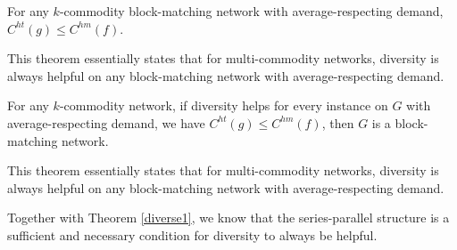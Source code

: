 \begin{theorem}
For any $k$-commodity block-matching network with average-respecting demand, $C^{ht}(g)\le C^{hm}(f)$.
\end{theorem}

\begin{proof-sketch}

This theorem essentially states that for multi-commodity networks, diversity is always helpful on any block-matching network with average-respecting demand. 
\end{proof-sketch}



\begin{theorem}
For any $k$-commodity network, if diversity helps for every instance on $G$ with average-respecting demand, we have $C^{ht}(g)\le C^{hm}(f)$, then $G$ is a block-matching network.
\end{theorem}

\begin{proof-sketch}

This theorem essentially states that for multi-commodity networks, diversity is always helpful on any block-matching network with average-respecting demand. 
\end{proof-sketch}

Together with Theorem \ref{diverse1}, we know that the series-parallel structure is a sufficient and necessary condition for diversity to always be helpful.

